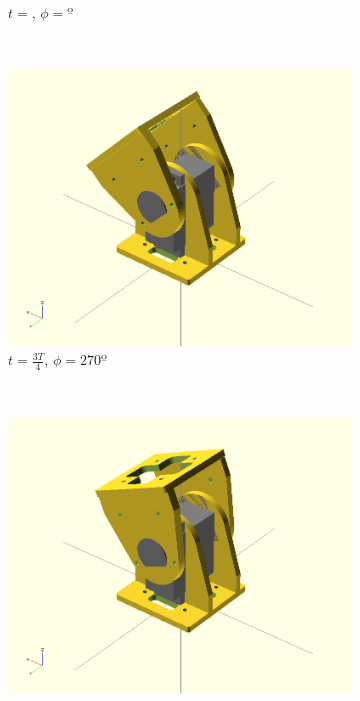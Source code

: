 \begin{figure}[h]
\begin{subfigure}[b]{0.18\textwidth}
                \caption{$t = $, $\phi=º$}
                \label{fig:Gait_osc_center_62_5-2}
        \end{subfigure}
        ~
        \begin{subfigure}[b]{0.18\textwidth}
                \centering
                \includegraphics[width=\textwidth]{images/Gait_osc_center_45.png}
                \caption{$t = \frac{3T}{4}$, $\phi=270º$}
                \label{fig:Gait_osc_center_45-2}
        \end{subfigure}
        ~
        \begin{subfigure}[b]{0.18\textwidth}
         	   \centering
                \includegraphics[width=\textwidth]{images/Gait_osc_center_62_5.png}

\end{subfigure}
\end{figure}
